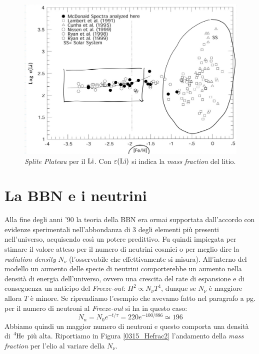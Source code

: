 \begin{figure}[!h]
    \centering
    \includegraphics[scale=0.25]{Immagini/0315_LiH.png}
    \caption{\textit{Splite Plateau} per il $\ce{Li}$. Con $\varepsilon (\ce{Li})$ si indica la \textit{mass fraction} del litio.}
    \label{0315_LiH}
\end{figure}
\newpage
\section{La BBN e i neutrini}
Alla fine degli anni '90 la teoria della BBN era ormai supportata dall'accordo con evidenze sperimentali nell'abbondanza di 3 degli elementi più presenti nell'universo, %
acquisendo così un potere predittivo. Fu quindi impiegata per stimare il valore atteso per il numero di neutrini cosmici o per meglio dire la \textit{radiation density} $N_\nu$ (l'osservabile che effettivamente si misura). All'interno del modello un aumento delle specie di neutrini comporterebbe un aumento nella densità di energia dell'universo, ovvero una crescita del rate di espansione e di conseguenza un anticipo del \textit{Freeze-out}: $H^2 \propto N_\nu T^4$, dunque se $N_\nu $ è maggiore allora $T$ è minore. Se riprendiamo l'esempio che avevamo fatto nel paragrafo  a pg. \pageref{a.grandi.linee} per il numero di neutroni al \textit{Freeze-out} si ha in questo caso:
$$N_n = N_0 e^{-t/\tau} = 220 e^{-100/886} \simeq 196$$
Abbiamo quindi un maggior numero di neutroni e questo comporta una densità di $\ce{^4He}$ più alta. Riportiamo in Figura \ref{0315_Hefrac2} l'andamento della \textit{mass fraction} per l'elio al variare della $N_\nu$.

